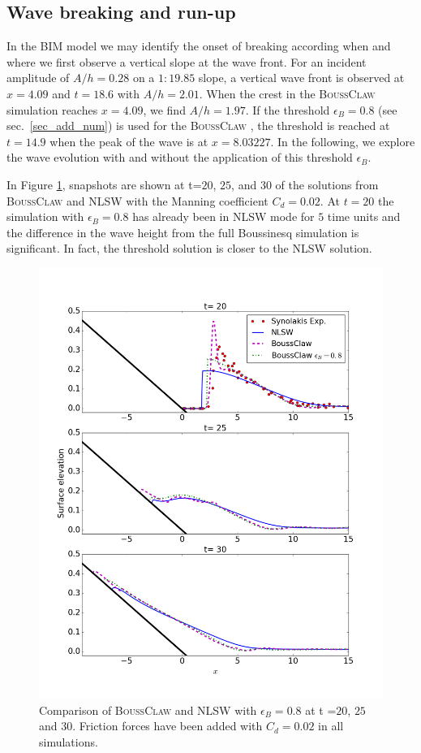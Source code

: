 \documentclass[review]{elsarticle}
\newcommand{\BoussClaw}{\textsc{BoussClaw} }
\begin{document}
\subsection{Wave breaking and run-up}
\label{sec:discuss_breaking}
In the BIM model we may identify the onset of breaking according when and where we first observe a vertical slope at the wave front.
For an incident amplitude of $A/h=0.28$ on a $1:19.85$ slope,
a vertical wave front is observed at $x=4.09$ and $t=18.6$ with $A/h=2.01$.
When the crest in the \BoussClaw simulation reaches $x=4.09$, 
we find $A/h=1.97$.
If the threshold $\epsilon_B=0.8$ (see sec.~\ref{sec_add_num})
is used for the \BoussClaw,
the threshold is  reached at $t=14.9$
when the peak of the wave is at $x=8.03227$.
In the following, we explore the wave evolution with and without
the application of this threshold $\epsilon_B$.


In Figure \ref{fig:boussclaw_th08}, snapshots are shown at 
t=$20$, $25$, and $30$ of the solutions from \BoussClaw and NLSW
with the Manning coefficient $C_d=0.02$.
At $t=20$ the simulation with $\epsilon_B=0.8$ has already been in NLSW mode for $5$ time units and the difference in the wave height 
from the full Boussinesq simulation is significant. In fact, the threshold solution is closer to the NLSW solution.

\begin{figure}[tbh!]
	\centering
	\includegraphics[width=.7\textwidth]{_fig/bim_boussclaw_etaB8}
	\caption{Comparison of \BoussClaw and NLSW 
		with $\epsilon_B=0.8$ at t =$20$, $25$ and $30$.
		Friction forces have been added with $C_d=0.02$ in all simulations.}
	\label{fig:boussclaw_th08}
\end{figure}
\end{document}
